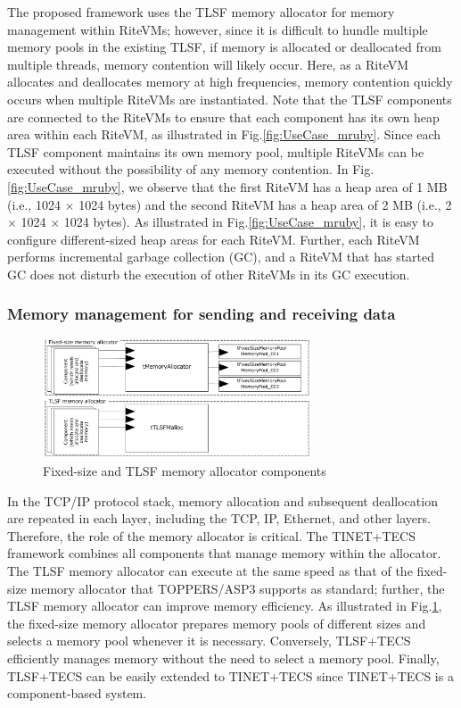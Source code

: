 \documentclass[JIP]{ipsj_v2/UTF8/ipsj}
\begin{document}
The proposed framework uses the TLSF memory allocator for memory management within RiteVMs; however, since it is difficult to hundle multiple memory pools in the existing TLSF, if memory is allocated or deallocated from multiple threads, memory contention will likely occur.
Here, as a RiteVM allocates and deallocates memory at high frequencies, memory contention quickly occurs when multiple RiteVMs are instantiated.
Note that the TLSF components are connected to the RiteVMs to ensure that each component has its own heap area within each RiteVM, as illustrated in Fig.\ref{fig:UseCase_mruby}.
Since each TLSF component maintains its own memory pool, multiple RiteVMs can be executed without the possibility of any memory contention.
In Fig.\ref{fig:UseCase_mruby}, we observe that the first RiteVM has a heap area of 1 MB (i.e., 1024 $\times$ 1024 bytes) and the second RiteVM has a heap area of 2 MB (i.e., 2 $\times$ 1024 $\times$ 1024 bytes).
As illustrated in Fig.\ref{fig:UseCase_mruby}, it is easy to configure different-sized heap areas for each RiteVM.
Further, each RiteVM performs incremental garbage collection (GC), and a RiteVM that has started GC does not disturb the execution of other RiteVMs in its GC execution.
    
\subsubsection*{Memory management for sending and receiving data}

\begin{figure}[t]
    \centering
    \includegraphics[width=8cm,clip]{figure/UseCase_TINET.pdf}
    \caption{Fixed-size and TLSF memory allocator components}
    \label{fig:UseCase_TINET}
\end{figure}

In the TCP/IP protocol stack, memory allocation and subsequent deallocation are repeated in each layer, including the TCP, IP, Ethernet, and other layers.
Therefore, the role of the memory allocator is critical.
The TINET+TECS framework combines all components that manage memory within the allocator.
The TLSF memory allocator can execute at the same speed as that of the fixed-size memory allocator that TOPPERS/ASP3 supports as standard; further, the TLSF memory allocator can improve memory efficiency.
As illustrated in Fig.\ref{fig:UseCase_TINET}, the fixed-size memory allocator prepares memory pools of different sizes and selects a memory pool whenever it is necessary.
Conversely, TLSF+TECS efficiently manages memory without the need to select a memory pool.
Finally, TLSF+TECS can be easily extended to TINET+TECS since TINET+TECS is a component-based system.
\end{document}

